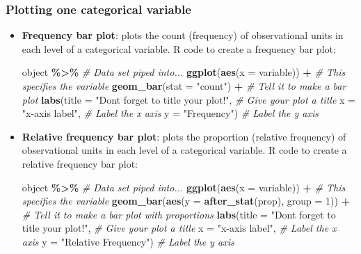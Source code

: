 \documentclass[
]{report}
\newenvironment{Shaded}{\begin{snugshade}}{\end{snugshade}}
\newcommand{\AttributeTok}[1]{\textcolor[rgb]{0.13,0.29,0.53}{#1}}
\newcommand{\CommentTok}[1]{\textcolor[rgb]{0.56,0.35,0.01}{\textit{#1}}}
\newcommand{\DecValTok}[1]{\textcolor[rgb]{0.00,0.00,0.81}{#1}}
\newcommand{\FunctionTok}[1]{\textcolor[rgb]{0.13,0.29,0.53}{\textbf{#1}}}
\newcommand{\NormalTok}[1]{#1}
\newcommand{\SpecialCharTok}[1]{\textcolor[rgb]{0.81,0.36,0.00}{\textbf{#1}}}
\newcommand{\StringTok}[1]{\textcolor[rgb]{0.31,0.60,0.02}{#1}}
\begin{document}
\subsubsection*{Plotting one categorical variable}\label{plotting-one-categorical-variable}

\begin{itemize}
\item
  \textbf{Frequency bar plot}: plots the count (frequency) of observational units in each level of a categorical variable. R code to create a frequency bar plot:

\begin{Shaded}
\begin{Highlighting}[]
\NormalTok{object }\SpecialCharTok{\%\textgreater{}\%} \CommentTok{\# Data set piped into...}
\FunctionTok{ggplot}\NormalTok{(}\FunctionTok{aes}\NormalTok{(}\AttributeTok{x =}\NormalTok{ variable)) }\SpecialCharTok{+}   \CommentTok{\# This specifies the variable}
\FunctionTok{geom\_bar}\NormalTok{(}\AttributeTok{stat =} \StringTok{"count"}\NormalTok{) }\SpecialCharTok{+}  \CommentTok{\# Tell it to make a bar plot}
\FunctionTok{labs}\NormalTok{(}\AttributeTok{title =} \StringTok{"Don\textquotesingle{}t forget to title your plot!"}\NormalTok{,  }
   \CommentTok{\# Give your plot a title}
   \AttributeTok{x =} \StringTok{"x{-}axis label"}\NormalTok{,   }\CommentTok{\# Label the x axis}
   \AttributeTok{y =} \StringTok{"Frequency"}\NormalTok{)  }\CommentTok{\# Label the y axis}
\end{Highlighting}
\end{Shaded}
\item
  \textbf{Relative frequency bar plot}: plots the proportion (relative frequency) of observational units in each level of a categorical variable. R code to create a relative frequency bar plot:

\begin{Shaded}
\begin{Highlighting}[]
\NormalTok{object }\SpecialCharTok{\%\textgreater{}\%} \CommentTok{\# Data set piped into...}
\FunctionTok{ggplot}\NormalTok{(}\FunctionTok{aes}\NormalTok{(}\AttributeTok{x =}\NormalTok{ variable)) }\SpecialCharTok{+}   \CommentTok{\# This specifies the variable}
\FunctionTok{geom\_bar}\NormalTok{(}\FunctionTok{aes}\NormalTok{(}\AttributeTok{y =} \FunctionTok{after\_stat}\NormalTok{(prop), }\AttributeTok{group =} \DecValTok{1}\NormalTok{)) }\SpecialCharTok{+}  \CommentTok{\# Tell it to make a bar plot with proportions}
\FunctionTok{labs}\NormalTok{(}\AttributeTok{title =} \StringTok{"Don\textquotesingle{}t forget to title your plot!"}\NormalTok{,  }
   \CommentTok{\# Give your plot a title}
   \AttributeTok{x =} \StringTok{"x{-}axis label"}\NormalTok{,   }\CommentTok{\# Label the x axis}
   \AttributeTok{y =} \StringTok{"Relative Frequency"}\NormalTok{)  }\CommentTok{\# Label the y axis}
\end{Highlighting}
\end{Shaded}
\end{itemize}
\end{document}
